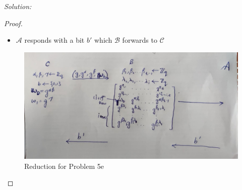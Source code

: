 \documentclass[a4paper, 11pt]{article}
\newenvironment{solution}
    {\textit{Solution:}}
    {\clearpage}
\newcommand{\calA}{\mathcal{A}}
\newcommand{\calB}{\mathcal{B}}
\newcommand{\calC}{\mathcal{C}}
\begin{document}
\begin{solution}
\begin{enumerate}[(a)]
\begin{proof}
{\begin{itemize}
                          \item $\calA$ responds with a bit $b'$ which $\calB$ forwards to $\calC$
                      \end{itemize}
                  }

                  \begin{figure}[!ht]
                      \centering
                      \includegraphics[scale=0.25]{images/Reduction5e.jpg}
                      \caption{Reduction for Problem 5e}
                      \label{fig:p5e}
                  \end{figure}


\end{proof}
\end{enumerate}
\end{solution}
\end{document}
